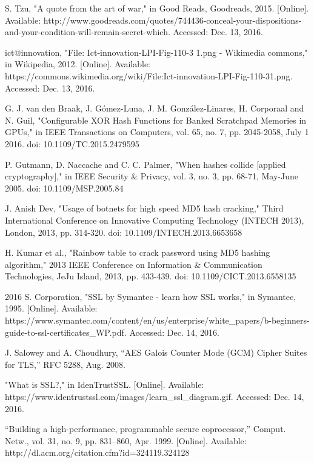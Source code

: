 \documentclass[journal]{IEEEtran}
\begin{document}
\begin{thebibliography}{1}


S. Tzu, "A quote from the art of war," in Good Reads, Goodreads, 2015. [Online]. Available: http://www.goodreads.com/quotes/744436-conceal-your-dispositions-and-your-condition-will-remain-secret-which. Accessed: Dec. 13, 2016.

ict@innovation, "File: Ict-innovation-LPI-Fig-110-3 1.png - Wikimedia commons," in Wikipedia, 2012. [Online]. Available: https://commons.wikimedia.org/wiki/File:Ict-innovation-LPI-Fig-110-31.png. Accessed: Dec. 13, 2016.

G. J. van den Braak, J. Gómez-Luna, J. M. González-Linares, H. Corporaal and N. Guil, "Configurable XOR Hash Functions for Banked Scratchpad Memories in GPUs," in IEEE Transactions on Computers, vol. 65, no. 7, pp. 2045-2058, July 1 2016.
doi: 10.1109/TC.2015.2479595

P. Gutmann, D. Naccache and C. C. Palmer, "When hashes collide [applied cryptography]," in IEEE Security \& Privacy, vol. 3, no. 3, pp. 68-71, May-June 2005.
doi: 10.1109/MSP.2005.84

J. Anish Dev, "Usage of botnets for high speed MD5 hash cracking," Third International Conference on Innovative Computing Technology (INTECH 2013), London, 2013, pp. 314-320.
doi: 10.1109/INTECH.2013.6653658

H. Kumar et al., "Rainbow table to crack password using MD5 hashing algorithm," 2013 IEEE Conference on Information \& Communication Technologies, JeJu Island, 2013, pp. 433-439.
doi: 10.1109/CICT.2013.6558135

2016 S. Corporation, "SSL by Symantec - learn how SSL works," in Symantec, 1995. [Online]. Available: https://www.symantec.com/content/en/us/enterprise/white\_papers/b-beginners-guide-to-ssl-certificates\_WP.pdf. Accessed: Dec. 14, 2016.

J. Salowey and A. Choudhury, “AES Galois Counter Mode (GCM) Cipher Suites for TLS,” RFC 5288, Aug. 2008.

"What is SSL?," in IdenTrustSSL. [Online]. Available: https://www.identrustssl.com/images/learn\_ssl\_diagram.gif. Accessed: Dec. 14, 2016.

“Building a high-performance, programmable secure coprocessor,” Comput.
Netw., vol. 31, no. 9, pp. 831–860, Apr. 1999. [Online]. Available:
http://dl.acm.org/citation.cfm?id=324119.324128


\end{thebibliography}
\end{document}

